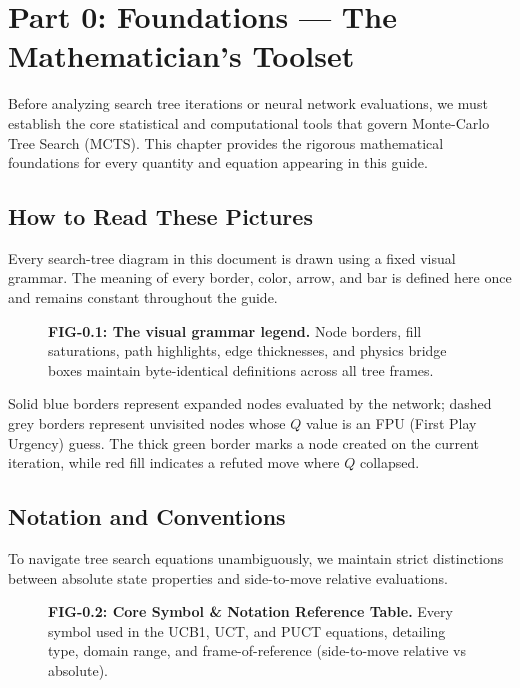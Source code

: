 \chapter{Part 0: Foundations — The Mathematician's Toolset}
\label{ch:foundations}

Before analyzing search tree iterations or neural network evaluations, we must establish the core statistical and computational tools that govern Monte-Carlo Tree Search (MCTS). This chapter provides the rigorous mathematical foundations for every quantity and equation appearing in this guide.

\section{How to Read These Pictures}
\label{sec:0_1}

Every search-tree diagram in this document is drawn using a fixed visual grammar. The meaning of every border, color, arrow, and bar is defined here once and remains constant throughout the guide.

\begin{figure}[htbp]
\centering

\caption{\textbf{FIG-0.1: The visual grammar legend.} Node borders, fill saturations, path highlights, edge thicknesses, and physics bridge boxes maintain byte-identical definitions across all tree frames.}
\label{fig:0_1}
\end{figure}

\begin{keyidea}
Solid blue borders represent expanded nodes evaluated by the network; dashed grey borders represent unvisited nodes whose $Q$ value is an FPU (First Play Urgency) guess. The thick green border marks a node created on the current iteration, while red fill indicates a refuted move where $Q$ collapsed.
\end{keyidea}

\section{Notation and Conventions}
\label{sec:0_2}

To navigate tree search equations unambiguously, we maintain strict distinctions between absolute state properties and side-to-move relative evaluations.

\begin{figure}[htbp]
\centering

\caption{\textbf{FIG-0.2: Core Symbol \& Notation Reference Table.} Every symbol used in the UCB1, UCT, and PUCT equations, detailing type, domain range, and frame-of-reference (side-to-move relative vs absolute).}
\label{fig:0_2}
\end{figure}

